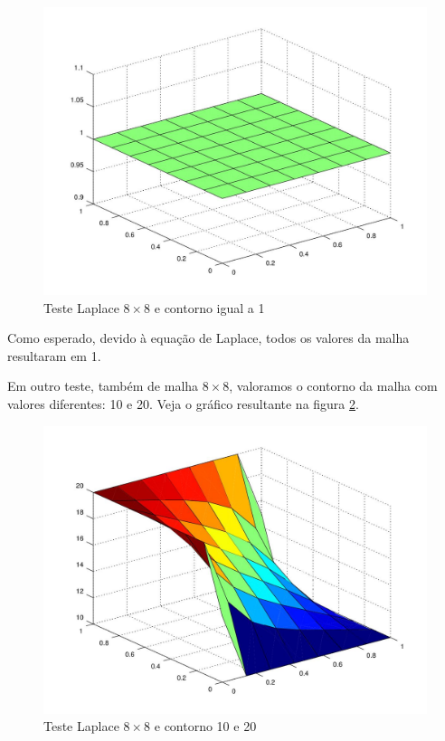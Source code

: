 \documentclass[
	11pt,				%
	oneside,			%
	a4paper,			%
	english,			%
	brazil,				%
	]{article}
\begin{document}
\begin{figure}[h]
\includegraphics[width=\textwidth]{laplace-8x8.jpg}
\centering
\caption{Teste Laplace $8\times8$ e contorno igual a 1}
\label{fig:1}
\end{figure}

Como esperado, devido à equação de Laplace, todos os valores da malha resultaram em 1.

Em outro teste, também de malha $8\times8$, valoramos o contorno da malha com valores diferentes: 10 e 20. Veja o gráfico resultante na figura \ref{fig:1-2}.

\begin{figure}[h]
\includegraphics[width=\textwidth]{laplace-8x8-2.jpg}
\centering
\caption{Teste Laplace $8\times8$ e contorno 10 e 20}
\label{fig:1-2}
\end{figure}
\end{document}
